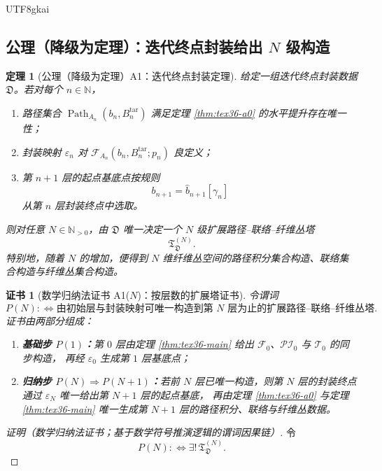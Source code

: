 \documentclass[12pt]{article}
\newtheorem{theorem}{定理}[section]
\newtheorem{Certificate}{证书}[section]
\newcommand{\NN}{\mathbb{N}}
\newcommand{\Path}{\operatorname{Path}}
\begin{document}
\begin{CJK*}{UTF8}{gkai}
\subsection{公理（降级为定理）：迭代终点封装给出 \texorpdfstring{$N$}{N} 级构造}
\label{subsec:tex36-iterative-theorem}

\begin{theorem}[公理（降级为定理）A1：迭代终点封装定理]
\label{thm:tex36-a1}
给定一组迭代终点封装数据 $\mathfrak D$。若对每个 $n\in\NN$，
\begin{enumerate}
  \item 路径集合 $\Path_{A_n}(b_n,B_n^{\mathrm{tar}})$ 满足定理 \ref{thm:tex36-a0} 的水平提升存在唯一性；
  \item 封装映射 $\varepsilon_n$ 对 $\mathcal{F}_{A_n}(b_n,B_n^{\mathrm{tar}};p_n)$ 良定义；
  \item 第 $n+1$ 层的起点基底点按规则
  \[
    b_{n+1}=\widehat{b}_{n+1}[\gamma_n]
  \]
  从第 $n$ 层封装终点中选取。
\end{enumerate}
则对任意 $N\in\NN_{>0}$，由 $\mathfrak D$ 唯一决定一个 $N$ 级扩展路径--联络--纤维丛塔
\[
  \mathfrak T_{\mathfrak D}^{(N)}.
\]
特别地，随着 $N$ 的增加，便得到 $N$ 维纤维丛空间的路径积分集合构造、联络集合构造与纤维丛集合构造。
\end{theorem}

\begin{Certificate}[数学归纳法证书 A1($N$)：按层数的扩展塔证书]
\label{cert:tex36-a1}
令谓词
\[
  P(N)
  :
  \Longleftrightarrow
  \text{由初始层与封装映射可唯一构造到第 $N$ 层为止的扩展路径--联络--纤维丛塔}.
\]
证书由两部分组成：
\begin{enumerate}
  \item \textbf{基础步 $P(1)$：}第 $0$ 层由定理 \ref{thm:tex36-main} 给出 $\mathcal{F}_0$、$\mathcal{PI}_0$ 与 $\mathcal{T}_0$ 的同步构造，
  再经 $\varepsilon_0$ 生成第 $1$ 层基底点；
  \item \textbf{归纳步 $P(N)\Rightarrow P(N+1)$：}若前 $N$ 层已唯一构造，则第 $N$ 层的封装终点通过 $\varepsilon_N$ 唯一给出第 $N+1$ 层的起点基底，
  再由定理 \ref{thm:tex36-a0} 与定理 \ref{thm:tex36-main} 唯一生成第 $N+1$ 层的路径积分、联络与纤维丛数据。
\end{enumerate}
\end{Certificate}

\begin{proof}[证明（数学归纳法证书；基于数学符号推演逻辑的谓词因果链）]
令
\[
  P(N)
  :
  \Longleftrightarrow
  \exists!\,\mathfrak T_{\mathfrak D}^{(N)}.
\]


\end{proof}
\end{CJK*}
\end{document}
